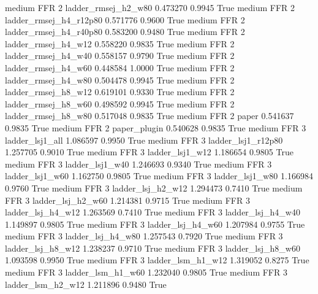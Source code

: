     medium      FFR                 2    ladder_rmsej_h2_w80   0.473270      0.9945    True
    medium      FFR                 2 ladder_rmsej_h4_r12p80   0.571776      0.9600    True
    medium      FFR                 2 ladder_rmsej_h4_r40p80   0.583200      0.9480    True
    medium      FFR                 2    ladder_rmsej_h4_w12   0.558220      0.9835    True
    medium      FFR                 2    ladder_rmsej_h4_w40   0.558157      0.9790    True
    medium      FFR                 2    ladder_rmsej_h4_w60   0.448584      1.0000    True
    medium      FFR                 2    ladder_rmsej_h4_w80   0.504478      0.9945    True
    medium      FFR                 2    ladder_rmsej_h8_w12   0.619101      0.9330    True
    medium      FFR                 2    ladder_rmsej_h8_w60   0.498592      0.9945    True
    medium      FFR                 2    ladder_rmsej_h8_w80   0.517048      0.9835    True
    medium      FFR                 2                  paper   0.541637      0.9835    True
    medium      FFR                 2           paper_plugin   0.540628      0.9835    True
    medium      FFR                 3        ladder_lsj1_all   1.086597      0.9950    True
    medium      FFR                 3     ladder_lsj1_r12p80   1.257705      0.9010    True
    medium      FFR                 3        ladder_lsj1_w12   1.186654      0.9805    True
    medium      FFR                 3        ladder_lsj1_w40   1.246693      0.9340    True
    medium      FFR                 3        ladder_lsj1_w60   1.162750      0.9805    True
    medium      FFR                 3        ladder_lsj1_w80   1.166984      0.9760    True
    medium      FFR                 3      ladder_lsj_h2_w12   1.294473      0.7410    True
    medium      FFR                 3      ladder_lsj_h2_w60   1.214381      0.9715    True
    medium      FFR                 3      ladder_lsj_h4_w12   1.263569      0.7410    True
    medium      FFR                 3      ladder_lsj_h4_w40   1.149897      0.9805    True
    medium      FFR                 3      ladder_lsj_h4_w60   1.207984      0.9755    True
    medium      FFR                 3      ladder_lsj_h4_w80   1.257543      0.7920    True
    medium      FFR                 3      ladder_lsj_h8_w12   1.238237      0.9710    True
    medium      FFR                 3      ladder_lsj_h8_w60   1.093598      0.9950    True
    medium      FFR                 3      ladder_lsm_h1_w12   1.319052      0.8275    True
    medium      FFR                 3      ladder_lsm_h1_w60   1.232040      0.9805    True
    medium      FFR                 3      ladder_lsm_h2_w12   1.211896      0.9480    True
